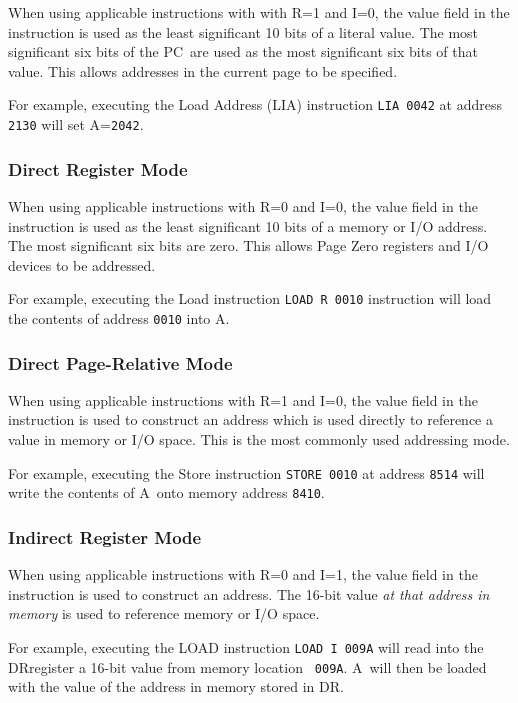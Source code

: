 \documentclass[11pt,a4paper,twocolumns]{article}
\newcommand\register[1]{\textsf{#1}}
\newcommand\A{\register{A}}
\newcommand\DR{\register{DR}}
\newcommand\PC{\register{PC}}
\begin{document}
When using applicable instructions with with R=1 and I=0, the value
field in the instruction is used as the least significant 10 bits of a
literal value. The most significant six bits of the \PC\  are used as the
most significant six bits of that value. This allows addresses in the
current page to be specified.

For example, executing the Load Address (LIA) instruction {\tt LIA
  0042} at address {\tt 2130} will set \A={\tt 2042}.

\subsubsection{Direct Register Mode}

When using applicable instructions with R=0 and I=0, the value field
in the instruction is used as the least significant 10 bits of a
memory or I/O address. The most significant six bits are zero. This
allows Page Zero registers and I/O devices to be addressed.

For example, executing the Load instruction {\tt LOAD R 0010}
instruction will load the contents of address {\tt 0010} into \A.

\subsubsection{Direct Page-Relative Mode}

When using applicable instructions with R=1 and I=0, the value field
in the instruction is used to construct an address which is used
directly to reference a value in memory or I/O space. This is the most
commonly used addressing mode.

For example, executing the Store instruction {\tt STORE 0010} at
address {\tt 8514} will write the contents of \A\  onto memory address
{\tt 8410}.

\subsubsection{Indirect Register Mode}

When using applicable instructions with R=0 and I=1, the value field
in the instruction is used to construct an address. The 16-bit value
{\em at that address in memory\/} is used to reference memory or I/O
space.

For example, executing the LOAD instruction {\tt LOAD I 009A} will
read into the \DR register a 16-bit value from memory location {\tt
  009A}. \A\  will then be loaded with the value of the address in
memory stored in \DR.
\end{document}
